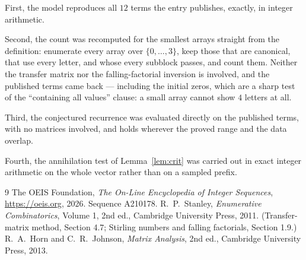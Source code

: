 \documentclass[11pt,a4paper]{article}
\theoremstyle{plain}
\theoremstyle{definition}
\begin{document}
First, the model reproduces all $12$ terms the entry publishes, exactly, in integer
arithmetic.

Second, the count was recomputed for the smallest arrays straight from the definition:
enumerate every array over $\{0,\dots,3\}$, keep those that are canonical, that use every
letter, and whose every subblock passes, and count them. Neither the transfer matrix nor the
falling-factorial inversion is involved, and the published terms came back --- including the
initial zeros, which are a sharp test of the ``containing all values'' clause: a small array
cannot show $4$ letters at all.

Third, the conjectured recurrence was evaluated directly on the published terms, with no
matrices involved, and holds wherever the proved range and the data overlap.

Fourth, the annihilation test of Lemma~\ref{lem:crit} was carried out in exact integer
arithmetic on the whole vector rather than on a sampled prefix.

\begin{thebibliography}{9}
 The OEIS Foundation, \emph{The On-Line Encyclopedia of Integer
Sequences}, \url{https://oeis.org}, 2026. Sequence A210178.
 R.~P.~Stanley, \emph{Enumerative Combinatorics}, Volume 1, 2nd ed.,
Cambridge University Press, 2011. (Transfer-matrix method, Section 4.7; Stirling numbers and
falling factorials, Section 1.9.)
 R.~A.~Horn and C.~R.~Johnson, \emph{Matrix Analysis}, 2nd ed., Cambridge
University Press, 2013.
\end{thebibliography}
\end{document}
